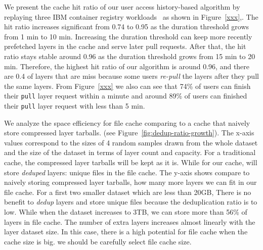 

We present the cache hit ratio of our user access history-based algorithm 
by replaying three IBM container registry workloads~\cite{dockerworkload}
as shown in Figure~\ref{xxx},.
The hit ratio increases significant from 0.74 to 0.95 as the duration threshold grows from 1 min to 10 min.
Increasing the duration threshold can keep more recently prefetched layers in the cache and serve later
pull requests. 
After that, the hit ratio stays stable around 0.96 as the duration threshold grows from 15 min to 20 min.
Therefore,
the highest hit ratio of our algorithm is around 0.96,
and there are 0.4 of layers that are miss because 
some users \emph{re-pull} the layers after they pull the same layers.
From Figure~\ref{xxx} we also can see that 74\% of users can finish their \texttt{pull} layer request
within a minute and 
around 89\% of users can finished their \texttt{pull} layer request with less than 5 min. 




We analyze the space efficiency for file cache comparing to a cache that naively store
compressed layer tarballs.
(see Figure~\ref{fig:dedup-ratio-growth}).
%
%
The x-axis values correspond to the sizes of 4 random samples drawn from the whole dataset and the size of the dataset in terms of layer count and capacity.
For a traditional cache, the compressed layer tarballs will be kept as it is.
While for our cache, \sysname will store \emph{deduped} layers: 
unique files in the file cache.
The y-axis shows compare to naively storing compressed layer tarballs,
how many more layers we can fit in our file cache. 
For a first two smaller dataset which are less than 20GB, 
There is no benefit to \emph{dedup} layers and store unique files
because the deduplication ratio is to low.
While when the dataset increases to 3TB, we can store more than 56\% of layers
in file cache.
The number of extra layers increases almost linearly with the layer dataset size.
In this case, there is a high potential for file cache when the cache size is big.
we should be carefully select file cache size. 
%
